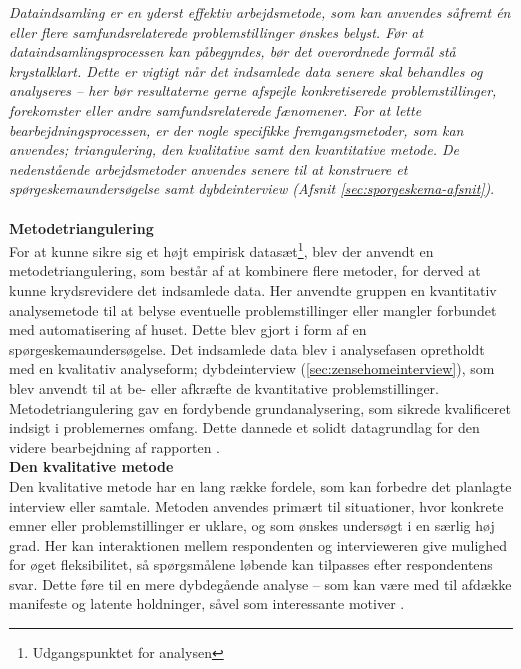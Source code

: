 \label{sec:dataindsamling-afsnit}
\textit{Dataindsamling er en yderst effektiv arbejdsmetode, som kan anvendes såfremt én eller flere samfundsrelaterede problemstillinger ønskes belyst. Før at dataindsamlingsprocessen kan påbegyndes, bør det overordnede formål stå krystalklart. Dette er vigtigt når det indsamlede data senere skal behandles og analyseres – her bør resultaterne gerne afspejle konkretiserede problemstillinger, forekomster eller andre samfundsrelaterede fænomener. For at lette bearbejdningsprocessen, er der nogle specifikke fremgangsmetoder, som kan anvendes; triangulering, den kvalitative samt den kvantitative metode. De nedenstående arbejdsmetoder anvendes senere til at konstruere et spørgeskemaundersøgelse samt dybdeinterview (Afsnit \ref{sec:sporgeskema-afsnit})}.\\\\
{\bf Metodetriangulering} \\
For at kunne sikre sig et højt empirisk datasæt\footnote{Udgangspunktet for analysen}, blev der anvendt en metodetriangulering, som består af at kombinere flere metoder, for derved at kunne krydsrevidere det indsamlede data. 
Her anvendte gruppen en kvantitativ analysemetode til at belyse eventuelle problemstillinger eller mangler forbundet med automatisering af huset. 
Dette blev gjort i form af en spørgeskemaundersøgelse. Det indsamlede data blev i analysefasen opretholdt med en kvalitativ analyseform; dybdeinterview (\ref{sec:zensehomeinterview}), som blev anvendt til at be- eller afkræfte de kvantitative problemstillinger. 
Metodetriangulering gav en fordybende grundanalysering, som sikrede kvalificeret indsigt i problemernes omfang. Dette dannede et solidt datagrundlag for den videre bearbejdning af rapporten \cite{AnalyseDanmark}. \\

{\bf Den kvalitative metode}\\
\label{sec:kvalitative_metode}
Den kvalitative metode har en lang række fordele, som kan forbedre det planlagte interview eller samtale. Metoden anvendes primært til situationer, hvor konkrete emner eller problemstillinger er uklare, og som ønskes undersøgt i en særlig høj grad. Her kan interaktionen mellem respondenten og intervieweren give mulighed for øget fleksibilitet, så spørgsmålene løbende kan tilpasses efter respondentens svar. Dette føre til en mere dybdegående analyse – som kan være med til afdække manifeste og latente holdninger, såvel som interessante motiver \cite{KommunikationItA}. \\

